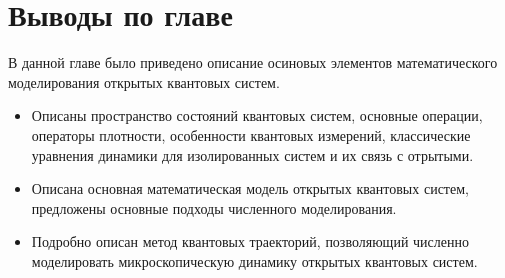 \section{Выводы по главе}\label{sec:ch1/results}
В данной главе было приведено описание осиновых элементов математического моделирования открытых квантовых систем.
\begin{itemize}[beginpenalty=10000] %
	\item Описаны пространство состояний квантовых систем, основные операции, операторы плотности, особенности квантовых измерений, классические уравнения динамики для изолированных систем и их связь с отрытыми.
	\item Описана основная математическая модель открытых квантовых систем, предложены основные подходы численного моделирования.
	\item Подробно описан метод квантовых траекторий, позволяющий численно моделировать микроскопическую динамику открытых квантовых систем. 
\end{itemize}





